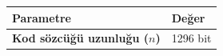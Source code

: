 {\def\LTcaptype{none} %
\begin{longtable}[]{@{}ll@{}}
\toprule\noalign{}
Parametre & Değer \\
\midrule\noalign{}
\endhead
\bottomrule\noalign{}
\endlastfoot
\textbf{Kod sözcüğü uzunluğu (\(n\))} & 1296 bit \\
\end{longtable}
}